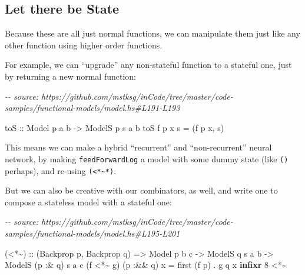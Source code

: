 \documentclass[]{article}
\newenvironment{Shaded}{}{}
\newcommand{\CommentTok}[1]{\textcolor[rgb]{0.38,0.63,0.69}{\textit{#1}}}
\newcommand{\DataTypeTok}[1]{\textcolor[rgb]{0.56,0.13,0.00}{#1}}
\newcommand{\DecValTok}[1]{\textcolor[rgb]{0.25,0.63,0.44}{#1}}
\newcommand{\KeywordTok}[1]{\textcolor[rgb]{0.00,0.44,0.13}{\textbf{#1}}}
\newcommand{\NormalTok}[1]{#1}
\newcommand{\OperatorTok}[1]{\textcolor[rgb]{0.40,0.40,0.40}{#1}}
\newcommand{\OtherTok}[1]{\textcolor[rgb]{0.00,0.44,0.13}{#1}}
\begin{document}
\hypertarget{let-there-be-state}{%
\subsection{Let there be State}\label{let-there-be-state}}

Because these are all just normal functions, we can manipulate them just like
any other function using higher order functions.

For example, we can ``upgrade'' any non-stateful function to a stateful one,
just by returning a new normal function:

\begin{Shaded}
\begin{Highlighting}[]
\CommentTok{{-}{-} source: https://github.com/mstksg/inCode/tree/master/code{-}samples/functional{-}models/model.hs\#L191{-}L193}

\OtherTok{toS ::} \DataTypeTok{Model}\NormalTok{  p   a b}
    \OtherTok{{-}>} \DataTypeTok{ModelS}\NormalTok{ p s a b}
\NormalTok{toS f p x s }\OtherTok{=}\NormalTok{ (f p x, s)}
\end{Highlighting}
\end{Shaded}

This means we can make a hybrid ``recurrent'' and ``non-recurrent'' neural
network, by making \texttt{feedForwardLog\textquotesingle{}} a model with some
dummy state (like \texttt{()} perhaps), and re-using
\texttt{(\textless{}*\textasciitilde{}*)}.

But we can also be creative with our combinators, as well, and write one to
compose a stateless model with a stateful one:

\begin{Shaded}
\begin{Highlighting}[]
\CommentTok{{-}{-} source: https://github.com/mstksg/inCode/tree/master/code{-}samples/functional{-}models/model.hs\#L195{-}L201}

\NormalTok{(}\OperatorTok{<*\textasciitilde{}}\NormalTok{)}
\OtherTok{  ::}\NormalTok{ (}\DataTypeTok{Backprop}\NormalTok{ p, }\DataTypeTok{Backprop}\NormalTok{ q)}
    \OtherTok{=>} \DataTypeTok{Model}\NormalTok{   p         b c}
    \OtherTok{{-}>} \DataTypeTok{ModelS}\NormalTok{       q  s a b}
    \OtherTok{{-}>} \DataTypeTok{ModelS}\NormalTok{ (p }\OperatorTok{:\&}\NormalTok{ q) s a c}
\NormalTok{(f }\OperatorTok{<*\textasciitilde{}}\NormalTok{ g) (p }\OperatorTok{:\&\&}\NormalTok{ q) x }\OtherTok{=}\NormalTok{ first (f p) }\OperatorTok{.}\NormalTok{ g q x}
\KeywordTok{infixr} \DecValTok{8} \OperatorTok{<*\textasciitilde{}}
\end{Highlighting}
\end{Shaded}
\end{document}
